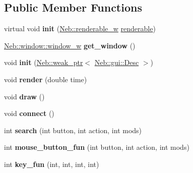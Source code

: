 \subsection*{\-Public \-Member \-Functions}
\begin{DoxyCompactItemize}
\item 
\hypertarget{classNeb_1_1gui_1_1layout_ad6fa086f64518d422b16f810f83f0250}{virtual void {\bfseries init} (\hyperlink{classNeb_1_1weak__ptr}{\-Neb\-::renderable\-\_\-w} \hyperlink{classNeb_1_1renderable}{renderable})}\label{classNeb_1_1gui_1_1layout_ad6fa086f64518d422b16f810f83f0250}

\item 
\hypertarget{classNeb_1_1gui_1_1layout_a37cb12d529360e0d15dae6caa8100b55}{\hyperlink{classNeb_1_1weak__ptr}{\-Neb\-::window\-::window\-\_\-w} {\bfseries get\-\_\-window} ()}\label{classNeb_1_1gui_1_1layout_a37cb12d529360e0d15dae6caa8100b55}

\item 
\hypertarget{classNeb_1_1gui_1_1layout_af415dbb46b787503ce59ea2633a120d5}{void {\bfseries init} (\hyperlink{classNeb_1_1weak__ptr}{\-Neb\-::weak\-\_\-ptr}$<$ \hyperlink{classNeb_1_1gui_1_1Desc}{\-Neb\-::gui\-::\-Desc} $>$)}\label{classNeb_1_1gui_1_1layout_af415dbb46b787503ce59ea2633a120d5}

\item 
\hypertarget{classNeb_1_1gui_1_1layout_a36e5373962c69242b86849fa32f01d62}{void {\bfseries render} (double time)}\label{classNeb_1_1gui_1_1layout_a36e5373962c69242b86849fa32f01d62}

\item 
\hypertarget{classNeb_1_1gui_1_1layout_af8e1c6e8812556b7b6d378b54c2e543a}{void {\bfseries draw} ()}\label{classNeb_1_1gui_1_1layout_af8e1c6e8812556b7b6d378b54c2e543a}

\item 
\hypertarget{classNeb_1_1gui_1_1layout_aa3ed6f6dcce6fa855fe21b5981ae3675}{void {\bfseries connect} ()}\label{classNeb_1_1gui_1_1layout_aa3ed6f6dcce6fa855fe21b5981ae3675}

\item 
\hypertarget{classNeb_1_1gui_1_1layout_a4c18c667db6f8785235b5a00267271e0}{int {\bfseries search} (int button, int action, int mods)}\label{classNeb_1_1gui_1_1layout_a4c18c667db6f8785235b5a00267271e0}

\item 
\hypertarget{classNeb_1_1gui_1_1layout_ae7b46224022698da37e6c211133655b2}{int {\bfseries mouse\-\_\-button\-\_\-fun} (int button, int action, int mods)}\label{classNeb_1_1gui_1_1layout_ae7b46224022698da37e6c211133655b2}

\item 
\hypertarget{classNeb_1_1gui_1_1layout_a8cfe092a0929ec0298b62dc47f9caf96}{int {\bfseries key\-\_\-fun} (int, int, int, int)}\label{classNeb_1_1gui_1_1layout_a8cfe092a0929ec0298b62dc47f9caf96}

\end{DoxyCompactItemize}
